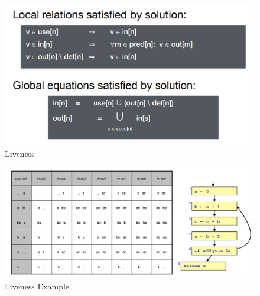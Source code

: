\begin{figure}[H]
    \centering
    \includegraphics[scale = 0.5]{assets/liveness.PNG}
    \caption{Liveness}
    \label{fig:liveness}
\end{figure}

\begin{figure}[H]
    \centering
    \includegraphics[scale = 0.55]{assets/liveness_example.PNG}
    \caption{Liveness Example}
    \label{fig:liveness}
\end{figure}
